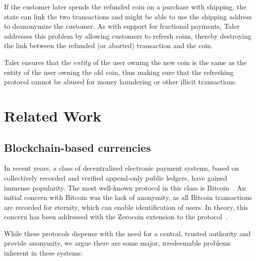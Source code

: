 \documentclass{llncs}
\begin{document}
If the customer later spends the refunded coin on a purchase with
shipping, the state can link the two transactions and might be able to
use the shipping address to deanonymize the customer.  As with support
for fractional payments, Taler addresses this problem by allowing
customers to refresh coins, thereby destroying the link between the
refunded (or aborted) transaction and the coin.

Taler ensures that the {\em entity} of the user owning the new coin is
the same as the entity of the user owning the old coin, thus making
sure that the refreshing protocol cannot be abused for money
laundering or other illicit transactions.


\section{Related Work}

\subsection{Blockchain-based currencies}

In recent years, a class of decentralized electronic payment systems,
based on collectively recorded and verified append-only public
ledgers, have gained immense popularity.  The most well-known protocol
in this class is Bitcoin~\cite{nakamoto2008bitcoin}.  An initial
concern with Bitcoin was the lack of anonymity, as all Bitcoin
transactions are recorded for eternity, which can enable
identification of users.  In theory, this concern has been addressed
with the Zerocoin extension to the protocol~\cite{miers2013zerocoin}.

While these protocols dispense with the need for a central, trusted
authority and provide anonymity, we argue there are some major,
irredeemable problems inherent in these systems:
\end{document}
